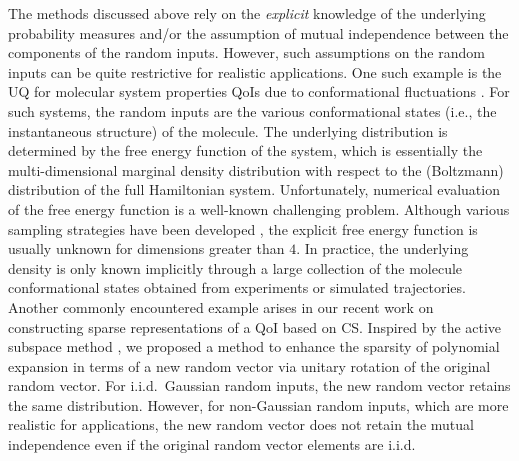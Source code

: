 The methods discussed above rely on the \emph{explicit} knowledge of the 
underlying probability measures and/or the assumption of mutual independence between
the components of the random inputs. However, such assumptions on the random inputs can be quite 
restrictive for realistic applications. One such example is the
\ac{UQ} for molecular system properties \acp{QoI} due to conformational 
fluctuations \cite{Huang_Protein_book_2005}. For such systems, the random inputs are the various conformational states 
(i.e., the instantaneous structure) of the molecule. The underlying distribution is 
determined by the free energy function of the system, which is essentially the multi-dimensional marginal density
distribution with respect to the (Boltzmann) distribution of the full Hamiltonian system.
Unfortunately, numerical evaluation of the free energy function is a well-known challenging
problem. Although various sampling strategies have been 
developed \cite{Kumar_Kollman_JCC_1992,Laio_Parrinello_PNAS_2002,Mar_Van_JCP_2008}, the
explicit free energy function is usually unknown for dimensions greater than $4$. 
In practice, the underlying density is only known implicitly through a large collection 
of the molecule conformational states obtained from experiments or simulated trajectories. 
Another commonly encountered example arises in our recent work \cite{Lei_Yang_MMS_2015} on constructing sparse 
representations of a  \ac{QoI} based on \ac{CS}. 
Inspired by the active subspace method \cite{ConstantineDW14}, we 
proposed a method to enhance the sparsity of polynomial expansion in terms of a 
new random vector via unitary rotation of the original random vector. For i.i.d.\ Gaussian 
random inputs, the new random vector retains the same distribution. However, for 
non-Gaussian random inputs, which are more realistic for applications, the new random vector
does not retain the mutual independence even if the original random vector elements are i.i.d.
%
%

